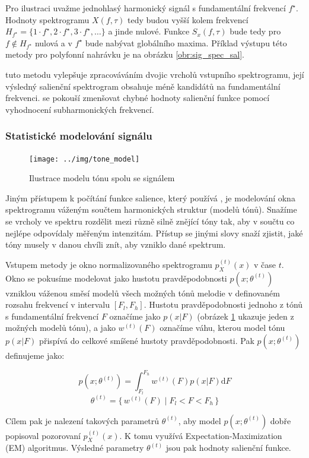 Pro ilustraci uvažme jednohlasý harmonický signál s fundamentální frekvencí $f^\star$. Hodnoty spektrogramu $X(f, \tau)$ tedy budou vyšší kolem frekvencí $H_{f^\star} = \{1\cdot f^\star, 2\cdot f^\star, 3\cdot f^\star, \dots\}$ a jinde nulové. Funkce $S_x(f, \tau)$ bude tedy pro $f \not\in H_{f^\star}$ nulová a v $f^\star$ bude nabývat globálního maxima. Příklad výstupu této metody pro polyfonní nahrávku je na obrázku \ref{obr:sig_spec_sal}.

\cite{Dressler2011} tuto metodu vylepšuje zpracováváním dvojic vrcholů vstupního spektrogramu, její výsledný salienční spektrogram obsahuje méně kandidátů na fundamentální frekvenci. \cite{Cancela2008} se pokouší zmenšovat chybné hodnoty salienční funkce pomocí vyhodnocení subharmonických frekvencí.

\subsubsection{Statistické modelování signálu}

\begin{figure}[h]\centering
    \texttt{[image: ../img/tone\_model]}
\caption{Ilustrace modelu tónu spolu se signálem}\label{obr:tone_model}
\end{figure}

Jiným přístupem k počítání funkce salience, který používá \cite{Goto1999}, je modelování okna spektrogramu váženým součtem harmonických struktur (modelů tónů). Snažíme se vrcholy ve spektru rozdělit mezi různě silně znějící tóny tak, aby v součtu co nejlépe odpovídaly měřeným intenzitám. Přístup se jinými slovy snaží zjistit, jaké tóny musely v danou chvíli znít, aby vzniklo dané spektrum. 

Vstupem metody je okno normalizovaného spektrogramu $p_X^{(t)}(x)$ v čase $t$. Okno se pokusíme modelovat jako hustotu pravděpodobnosti $p(x; \theta^{(t)})$ vzniklou váženou směsí modelů všech možných tónů melodie v definovaném rozsahu frekvencí v intervalu $[F_l, F_h]$. Hustotu pravděpodobnosti jednoho z tónů s fundamentální frekvencí $F$ označíme jako $p(x|F)$ (obrázek \ref{obr:tone_model} ukazuje jeden z možných modelů tónu), a jako $w^{(t)}(F)$ označíme váhu, kterou model tónu $p(x|F)$ přispívá do celkové smíšené hustoty pravděpodobnosti. Pak $p(x; \theta^{(t)})$ definujeme jako:

$$p(x; \theta^{(t)}) = \int_{F_l}^{F_h}{w^{(t)}(F)p(x|F) \mathrm{d}F}$$
$$\theta^{(t)} = \{\, w^{(t)}(F) \mid F_l < F < F_h \,\}$$

Cílem pak je nalezení takových parametrů $\theta^{(t)}$, aby model $p(x; \theta^{(t)})$ dobře popisoval pozorovaní $p_X^{(t)}(x)$. K tomu \cite{Goto1999} využívá Expectation-Maximization (EM) algoritmus. Výsledné parametry $\theta^{(t)}$ jsou pak hodnoty salienční funkce.

